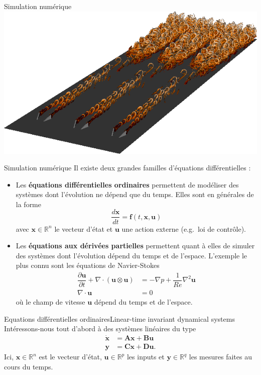 \documentclass[usenames,dvipsnames,svgnames,10pt,aspectratio=169]{beamer}
\begin{document}
\begin{frame}[t, c]{Simulation numérique}{}
  \centering
  \includegraphics[width=.8\textwidth]{instability_and_transition}
\end{frame}

\begin{frame}[t, c]{Simulation numérique}{}
  Il existe deux grandes familles d'équations différentielles :
  \begin{itemize}
  \item Les \alert{\textbf{équations différentielles ordinaires}} permettent de modéliser des systèmes dont l'évolution ne dépend que du temps.
    Elles sont en générales de la forme
    \[
    \dfrac{d\bm{x}}{dt} = \bm{f}(t, \bm{x}, \bm{u})
    \]
    avec $\bm{x} \in \mathbb{R}^n$ le vecteur d'état et $\bm{u}$ une action externe (e.g.\ loi de contrôle).

    \medskip

  \item Les \alert{\textbf{équations aux dérivées partielles}} permettent quant à elles de simuler des systèmes dont l'évolution dépend du temps et de l'espace.
    L'exemple le plus connu sont les équations de Navier-Stokes
    \[
    \begin{aligned}
      \dfrac{\partial \bm{u}}{\partial t} + \nabla \cdot \left( \bm{u} \otimes \bm{u} \right) & = - \nabla p + \dfrac{1}{Re} \nabla^2 \bm{u} \\
      \nabla \cdot \bm{u} & = 0
    \end{aligned}
    \]
    où le champ de vitesse $\bm{u}$ dépend du temps et de l'espace.
  \end{itemize}

  \vspace{1cm}
\end{frame}

\begin{frame}[t, c]{Equations différentielles ordinaires}{Linear-time invariant dynamical systems}
  Intéressons-nous tout d'abord à des systèmes linéaires du type
  \[
  \begin{aligned}
    \dot{\bm{x}} & = \bm{Ax} + \bm{Bu} \\
    \bm{y} & = \bm{Cx} + \bm{Du}.
  \end{aligned}
  \]
  Ici, $\bm{x} \in \mathbb{R}^n$ est le vecteur d'état, $\bm{u} \in \mathbb{R}^p$ les inputs et $\bm{y} \in \mathbb{R}^q$ les mesures faites au cours du temps.
\end{frame}
\end{document}

